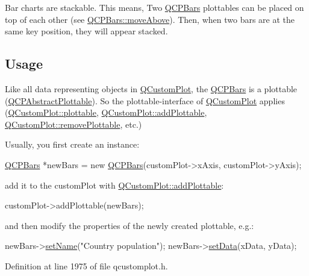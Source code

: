 Bar charts are stackable. This means, Two \hyperlink{class_q_c_p_bars}{Q\-C\-P\-Bars} plottables can be placed on top of each other (see \hyperlink{class_q_c_p_bars_ac22e00a6a41509538c21b04f0a57318c}{Q\-C\-P\-Bars\-::move\-Above}). Then, when two bars are at the same key position, they will appear stacked.\hypertarget{class_q_c_p_statistical_box_usage}{}\subsection{Usage}\label{class_q_c_p_statistical_box_usage}
Like all data representing objects in \hyperlink{class_q_custom_plot}{Q\-Custom\-Plot}, the \hyperlink{class_q_c_p_bars}{Q\-C\-P\-Bars} is a plottable (\hyperlink{class_q_c_p_abstract_plottable}{Q\-C\-P\-Abstract\-Plottable}). So the plottable-\/interface of \hyperlink{class_q_custom_plot}{Q\-Custom\-Plot} applies (\hyperlink{class_q_custom_plot_a32de81ff53e263e785b83b52ecd99d6f}{Q\-Custom\-Plot\-::plottable}, \hyperlink{class_q_custom_plot_ab7ad9174f701f9c6f64e378df77927a6}{Q\-Custom\-Plot\-::add\-Plottable}, \hyperlink{class_q_custom_plot_af3dafd56884208474f311d6226513ab2}{Q\-Custom\-Plot\-::remove\-Plottable}, etc.)

Usually, you first create an instance\-: 
\begin{DoxyCode}
\hyperlink{class_q_c_p_bars}{QCPBars} *newBars = \textcolor{keyword}{new} \hyperlink{class_q_c_p_bars_a64006999ad9dff308f40df41cef176ad}{QCPBars}(customPlot->xAxis, customPlot->yAxis);
\end{DoxyCode}
 add it to the custom\-Plot with \hyperlink{class_q_custom_plot_ab7ad9174f701f9c6f64e378df77927a6}{Q\-Custom\-Plot\-::add\-Plottable}\-: 
\begin{DoxyCode}
customPlot->addPlottable(newBars);
\end{DoxyCode}
 and then modify the properties of the newly created plottable, e.\-g.\-: 
\begin{DoxyCode}
newBars->\hyperlink{class_q_c_p_abstract_plottable_ab79c7ba76bc7fa89a4b3580e12149f1f}{setName}(\textcolor{stringliteral}{"Country population"});
newBars->\hyperlink{class_q_c_p_bars_aa3435aab19e0a49e4e7b41bd36a8d96b}{setData}(xData, yData);
\end{DoxyCode}
 

Definition at line 1975 of file qcustomplot.\-h.



